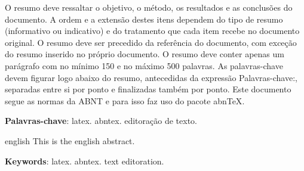 \setlength{\absparsep}{18pt} 
\begin{resumo}
    O resumo deve ressaltar o objetivo, o método, os resultados e as conclusões do documento. A ordem e a extensão destes itens dependem do tipo de resumo (informativo ou indicativo) e do tratamento que cada item recebe no documento original. O resumo deve ser precedido da referência do documento, com exceção do resumo inserido no próprio documento. O resumo deve conter apenas um parágrafo com no mínimo 150 e no máximo 500 palavras. As palavras-chave devem figurar logo abaixo do resumo, antecedidas da expressão Palavras-chave:, separadas entre si por ponto e finalizadas também por ponto. Este documento segue as normas da \gls{ABNT} e para isso faz uso do pacote \gls{abnTeX}.
    
    \textbf{Palavras-chave}: latex. abntex. editoração de texto.
\end{resumo}

\begin{resumo}[Abstract]
\begin{otherlanguage*}{english}
    This is the english abstract.
\vspace{\onelineskip}

\noindent 
\textbf{Keywords}: latex. abntex. text editoration.
\end{otherlanguage*}
\end{resumo}
